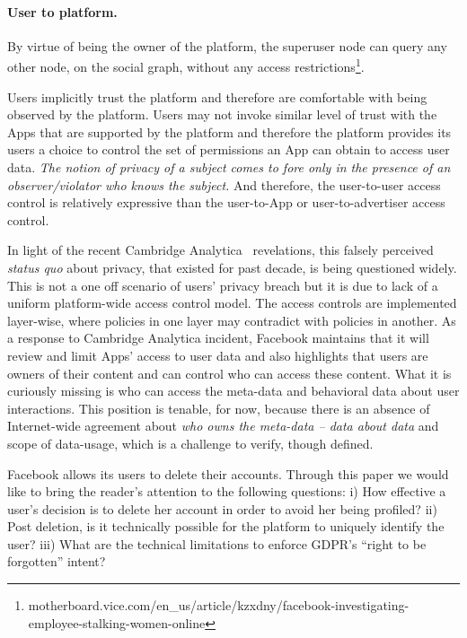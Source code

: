 \documentclass[a4paper,twoside]{article}
\begin{document}
\paragraph{User to platform.} By virtue of being the owner of the
platform, the superuser node can query any other node, on the social
graph, without any access
restrictions\footnote{motherboard.vice.com/en\_us/article/kzxdny/facebook-investigating-employee-stalking-women-online}.

Users implicitly trust the platform and therefore are comfortable with
being observed by the platform. Users may not invoke similar level of
trust with the Apps that are supported by the platform and therefore
the platform provides its users a choice to control the set of
permissions an App can obtain to access user data. \textit{The notion
  of privacy of a subject comes to fore only in the presence of an
  observer/violator who knows the subject.} And therefore, the
user-to-user access control is relatively expressive than the
user-to-App or user-to-advertiser access control.

In light of the recent Cambridge Analytica~\cite{fb-ca-lse}
revelations, this falsely perceived \textit{status quo} about privacy,
that existed for past decade, is being questioned widely. This is not
a one off scenario of users' privacy breach but it is due to lack of a
uniform platform-wide access control model. The access controls are
implemented layer-wise, where policies in one layer may contradict
with policies in another. As a response to Cambridge Analytica
incident, Facebook maintains that it will review and limit Apps'
access to user data and also highlights that users are owners of their
content and can control who can access these content. What it is
curiously missing is who can access the meta-data and behavioral data
about user interactions. This position is tenable, for now, because
there is an absence of Internet-wide agreement about \textit{who owns
  the meta-data -- data about data} and scope of data-usage, which is
a challenge to verify, though defined.

Facebook allows its users to delete their accounts. Through this paper
we would like to bring the reader's attention to the following
questions: i) How effective a user's decision is to delete her account
in order to avoid her being profiled? ii) Post deletion, is it
technically possible for the platform to uniquely identify the user?
iii) What are the technical limitations to enforce GDPR's ``right to
be forgotten'' intent?
\end{document}
